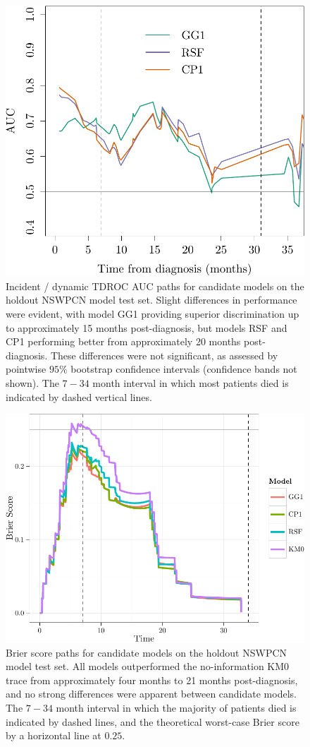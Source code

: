 \documentclass[dissertation.tex]{subfiles}
\begin{document}
\begin{figure}
\centering
  \includegraphics[width=.7\linewidth]{analysis/nomogram/figure/05-model-selection-roc-id-1}
  \caption[Time-dependent \texorpdfstring{\acrshort{AUC}}{AUC} paths for candidate models on holdout data]{Incident / dynamic \gls{TDROC} \gls{AUC} paths for candidate models on the holdout \gls{NSWPCN} model test set.  Slight differences in performance were evident, with model GG1 providing superior discrimination up to approximately 15 months post-diagnosis, but models RSF and CP1 performing better from approximately 20 months post-diagnosis.  These differences were not significant, as assessed by pointwise $95\%$ bootstrap confidence intervals (confidence bands not shown).  The $7-34$ month interval in which most patients died is indicated by dashed vertical lines.}
\label{fig:nomo-tdauc-paths}
\end{figure}

\begin{figure}
\centering
  \includegraphics[width=.7\linewidth]{analysis/nomogram/figure/05-model-selection-bs-paths-1}
  \caption[Brier score paths for candidate models on holdout data]{Brier score paths for candidate models on the holdout \gls{NSWPCN} model test set.  All models outperformed the no-information KM0 trace from approximately four months to 21 months post-diagnosis, and no strong differences were apparent between candidate models.  The $7-34$ month interval in which the majority of patients died is indicated by dashed lines, and the theoretical worst-case Brier score by a horizontal line at $0.25$.}
\label{fig:nomo-brier-paths}
\end{figure}
\end{document}
